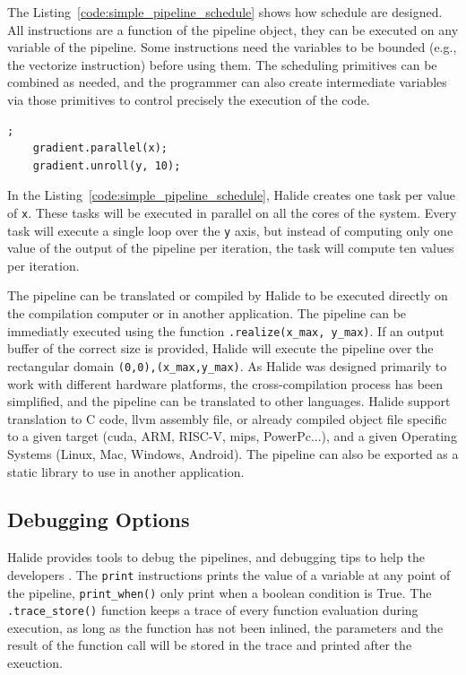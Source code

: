 	The Listing~\ref{code:simple_pipeline_schedule} shows how schedule are designed.
	All instructions are a function of the pipeline object, they can be executed on any variable of the  pipeline. Some instructions need the variables to be bounded (e.g., the vectorize instruction) before using them.
	The scheduling primitives can be combined as needed, and the programmer can also create intermediate variables via those primitives to control precisely the execution of the code.


	\begin{lstlisting}[caption={Simple Schedule Example.}, captionpos=b,label={code:simple_pipeline_schedule}];
	gradient.parallel(x);
	gradient.unroll(y, 10);
	\end{lstlisting}

	In the Listing~\ref{code:simple_pipeline_schedule},
 	Halide creates one task per value of \verb|x|. These tasks will be executed in parallel on all the cores of the system. Every task will execute a single loop over the \verb|y| axis, but instead of computing only one value of the output of the pipeline per iteration, the task will compute ten values per iteration.


	The pipeline can be translated or compiled by Halide to be executed directly on the compilation computer or in another application.
	The pipeline can be immediatly executed using the function \texttt{.realize(x\_max, y\_max)}. If an output buffer of the correct size is provided, Halide will execute the pipeline over the rectangular domain \texttt{(0,0),(x\_max,y\_max)}.
	 As Halide was designed primarily to work with different hardware platforms, the  cross-compilation process  has been simplified, and the pipeline can be translated to other languages.
	 Halide support translation to C code, \gls{llvm} assembly file, or already compiled object file specific to a given target (\gls{cuda}, ARM, RISC-V, \gls{mips}, PowerPc...), and a given Operating Systems (Linux, Mac, Windows, Android). The pipeline can also be exported as a static library to use in another application.

\subsection{Debugging Options}

	Halide provides tools to debug the pipelines, and debugging tips to help the developers \cite{Web:HalideDebug}.
	The \texttt{print} instructions prints the value of a variable at any point of the pipeline, \texttt{print\_when()} only print when a boolean condition is True.
	The  \verb|.trace_store()| function keeps a trace of every function evaluation during execution, as long as the function has not been inlined, the parameters and the result of the function call will be stored in the trace and printed after the exeuction.

